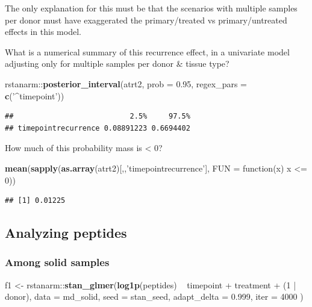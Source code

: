 \documentclass[]{article}
\newenvironment{Shaded}{\begin{snugshade}}{\end{snugshade}}
\newcommand{\KeywordTok}[1]{\textcolor[rgb]{0.13,0.29,0.53}{\textbf{{#1}}}}
\newcommand{\DataTypeTok}[1]{\textcolor[rgb]{0.13,0.29,0.53}{{#1}}}
\newcommand{\DecValTok}[1]{\textcolor[rgb]{0.00,0.00,0.81}{{#1}}}
\newcommand{\FloatTok}[1]{\textcolor[rgb]{0.00,0.00,0.81}{{#1}}}
\newcommand{\StringTok}[1]{\textcolor[rgb]{0.31,0.60,0.02}{{#1}}}
\newcommand{\NormalTok}[1]{{#1}}
\begin{document}
The only explanation for this must be that the scenarios with multiple
samples per donor must have exaggerated the primary/treated vs
primary/untreated effects in this model.

What is a numerical summary of this recurrence effect, in a univariate
model adjusting only for multiple samples per donor \& tissue type?

\begin{Shaded}
\begin{Highlighting}[]
\NormalTok{rstanarm::}\KeywordTok{posterior_interval}\NormalTok{(atrt2, }\DataTypeTok{prob =} \FloatTok{0.95}\NormalTok{, }\DataTypeTok{regex_pars =} \KeywordTok{c}\NormalTok{(}\StringTok{'^timepoint'}\NormalTok{))}
\end{Highlighting}
\end{Shaded}

\begin{verbatim}
##                           2.5%     97.5%
## timepointrecurrence 0.08891223 0.6694402
\end{verbatim}

How much of this probability mass is \textless{} 0?

\begin{Shaded}
\begin{Highlighting}[]
\KeywordTok{mean}\NormalTok{(}\KeywordTok{sapply}\NormalTok{(}\KeywordTok{as.array}\NormalTok{(atrt2)[,,}\StringTok{'timepointrecurrence'}\NormalTok{], }\DataTypeTok{FUN =} \NormalTok{function(x) x <=}\StringTok{ }\DecValTok{0}\NormalTok{))}
\end{Highlighting}
\end{Shaded}

\begin{verbatim}
## [1] 0.01225
\end{verbatim}

\subsection{Analyzing peptides}\label{analyzing-peptides}

\subsubsection{Among solid samples}\label{among-solid-samples}

\begin{Shaded}
\begin{Highlighting}[]
\NormalTok{f1 <-}\StringTok{ }\NormalTok{rstanarm::}\KeywordTok{stan_glmer}\NormalTok{(}\KeywordTok{log1p}\NormalTok{(peptides) ~}\StringTok{ }
\StringTok{                                }\NormalTok{timepoint +}\StringTok{ }\NormalTok{treatment +}\StringTok{ }\NormalTok{(}\DecValTok{1} \NormalTok{|}\StringTok{ }\NormalTok{donor),}
                              \DataTypeTok{data =} \NormalTok{md_solid,}
                              \DataTypeTok{seed =} \NormalTok{stan_seed,}
                              \DataTypeTok{adapt_delta =} \FloatTok{0.999}\NormalTok{,}
                              \DataTypeTok{iter =} \DecValTok{4000}
                              \NormalTok{)}
\end{Highlighting}
\end{Shaded}
\end{document}
